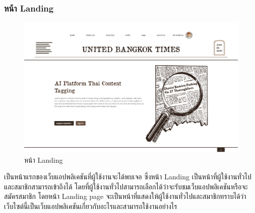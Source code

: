 \documentclass[12pt,oneside,openright,a4paper]{cpe-thai-project}
\begin{document}
\begin{itemize}
\subsubsection{หน้า Landing}
  \begin{figure}[!ht]\centering
    \includegraphics[width=15cm]{./img/project_ui/landing_page1.png} 
    \caption{หน้า Landing}\label{fig:landing_page_1} 
  \end{figure}
  \hspace*{1cm}เป็นหน้าแรกของเว็บแอปพลิเคชันที่ผู้ใช้งานจะได้พบเจอ 
  ซึ่งหน้า Landing เป็นหน้าที่ผู้ใช้งานทั่วไปและสมาชิกสามารถเข้าถึงได้ โดยที่ผู้ใช้งานทั่วไปสามารถเลือกได้ว่าจะรับชมเว็บแอปพลิเคชันหรือจะสมัครสมาชิก 
  โดยหน้า Landing page จะเป็นหน้าที่แสดงให้ผู้ใช้งานทั่วไปและสมาชิกทราบได้ว่าเว็บไซต์นี้เป็นเว็บแอปพลิเคชันเกี่ยวกับอะไรและสามารถใช้งานอย่างไร


\end{itemize}
\end{document}
